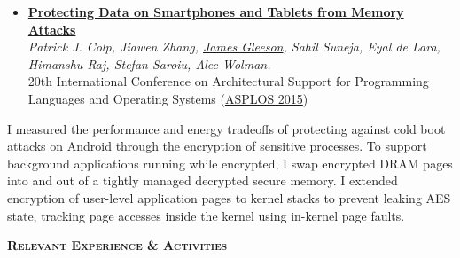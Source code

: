 \documentclass[letterpaper,11pt]{article}
\newcommand{\heading}[1]{
    \noindent
    \textsc{\textbf{#1}}
}
\begin{document}
\begin{itemize}[leftmargin=*]
\item 
    \noindent
        \textbf{\href{https://dl.acm.org/doi/10.1145/2694344.2694380}{Protecting Data on Smartphones and Tablets from Memory Attacks}} \\
    \noindent
    \textit{Patrick J. Colp, Jiawen Zhang, \underline{James Gleeson}, Sahil Suneja, Eyal de Lara, Himanshu Raj, Stefan Saroiu, Alec Wolman.} \\
    \noindent
    20th International Conference on Architectural Support for Programming Languages and Operating Systems (\href{http://asplos15.bilkent.edu.tr}{ASPLOS 2015})
\end{itemize}
\vspace{-0.9em}
%
I measured the performance and energy tradeoffs of protecting against 
cold boot attacks on Android through the encryption of sensitive processes.  To 
support background applications running while encrypted, I swap encrypted DRAM 
pages into and out of a tightly managed decrypted secure memory.
I extended encryption of user-level application pages to kernel stacks 
to prevent leaking AES state, tracking page accesses inside the kernel using 
in-kernel page faults.



\vspace{1em}
\heading{Relevant Experience \& Activities}

\end{document}
